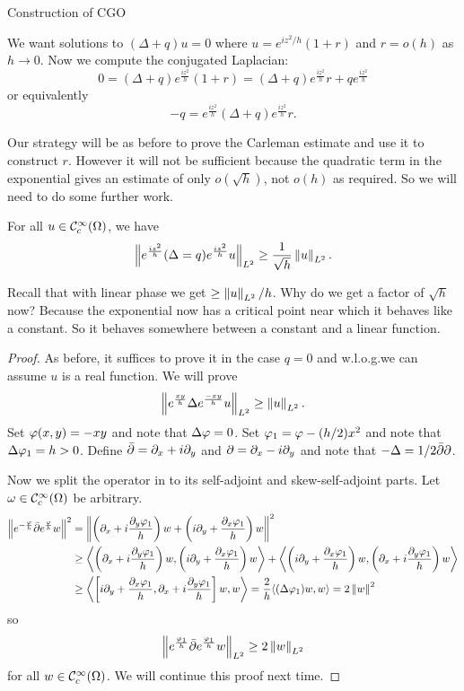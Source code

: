 Construction of CGO

We want solutions to $(\Delta+q)u=0$ where $u=e^{iz^2/h}(1+r)$ and $r=o(h)$ as $h \to 0$.
Now we compute the conjugated Laplacian:
\[ 0=(\Delta+q)e^\frac{iz^2}{h}(1+r) = (\Delta+q)e^\frac{iz^2}{h}r+qe^\frac{iz^2}{h} \]
or equivalently
\[ -q = e^\frac{iz^2}h (\Delta+q) e^\frac{iz^2}h r. \]

Our strategy will be as before to prove the Carleman estimate and use it to construct $r$.
However it will not be sufficient because the quadratic term in the exponential gives an estimate of only $o(\sqrt{h})$, not $o(h)$ as required.
So we will need to do some further work.

\begin{prop}
  For all $u \in \mathcal{C}_c^\infty(\Omega)$, we have
  \[ \left\lVert  e^\frac{iz^2}h (\Delta=q) e^\frac{iz^2}h u \right\rVert_{L^2} \geq \frac{1}{\sqrt{h}} \left\lVert u \right\rVert_{L^2}. \]
\end{prop}

\begin{rmk}
  Recall that with linear phase we get $\geq \left\lVert u \right\rVert_{L^2}/h$.
  Why do we get a factor of $\sqrt{h}$ now?
  Because the exponential now has a critical point near which it behaves like a constant.
  So it behaves somewhere between a constant and a linear function.
\end{rmk}

\begin{proof}
  As before, it suffices to prove it in the case $q=0$ and w.l.o.g.\@ we can assume $u$ is a real function.
  We will prove
  \[ \left\lVert e^\frac{xy}h \Delta e^\frac{-xy}h u \right\rVert_{L^2} \geq \left\lVert u \right\rVert_{L^2}. \]
  Set $\varphi(x,y)=-xy$ and note that $\Delta\varphi=0$.
  Set $\varphi_1=\varphi-(h/2)x^2$ and note that $\Delta\varphi_1=h>0$.
  Define $\bar{\partial}=\partial_x+i\partial_y$ and $\partial=\partial_x-i\partial_y$ and note that $-\Delta=1/2\bar{\partial}\partial$.
  
  Now we split the operator in to its self-adjoint and skew-self-adjoint parts.
  Let $\omega \in \mathcal{C}_c^\infty(\Omega)$ be arbitrary.
  \begin{align*}
    \left\lVert e^{-\frac{\varphi} h} \bar{\partial} e^\frac {\varphi} h w \right\rVert^2 &= \left\lVert  \left( \partial_x + i\frac{\partial_y\varphi_1}h \right)w + \left( i\partial_y+\frac{\partial_x\varphi_1}h \right)w \right\rVert^2 \\
    &\geq {\left\langle \left( \partial_x + i\frac{\partial_y\varphi_1}h \right)w,\left( i\partial_y+\frac{\partial_x\varphi_1}h \right)w \right\rangle} + {\left\langle \left( i\partial_y+\frac{\partial_x\varphi_1}h \right)w,\left( \partial_x + i\frac{\partial_y\varphi_1}h \right)w \right\rangle} \\
    &\geq {\left\langle \left[ i\partial_y+\frac{\partial_x\varphi_1}h, \partial_x + i\frac{\partial_y\varphi_1}h \right]w,w \right\rangle} = \frac 2h {\left\langle (\Delta\varphi_1)w,w \right\rangle} = 2\left\lVert w \right\rVert^2
  \end{align*}
  so 
  \[ \left\lVert e^\frac{\varphi_1}h \bar{\partial} e^\frac{\varphi_1}h w \right\rVert_{L^2} \geq 2 \left\lVert w \right\rVert_{L^2} \]
  for all $w \in \mathcal{C}_c^\infty(\Omega)$.
  We will continue this proof next time.
\end{proof}

